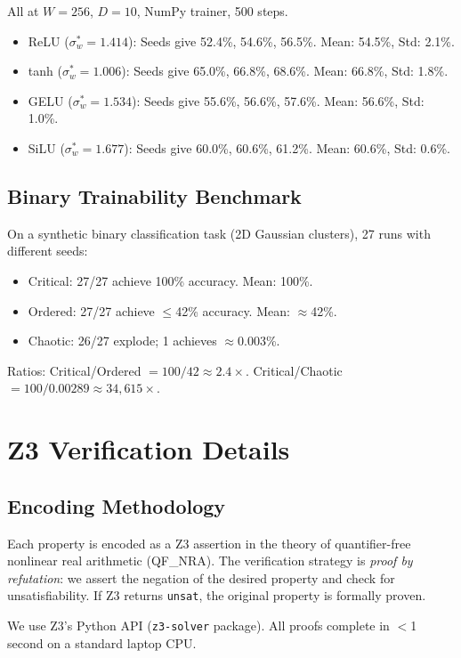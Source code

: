 \documentclass[10pt]{article}
\begin{document}
All at $W=256$, $D=10$, NumPy trainer, 500 steps.
\begin{itemize}[nosep]
    \item ReLU ($\sigma_w^* = 1.414$): Seeds give 52.4\%, 54.6\%, 56.5\%.  Mean: 54.5\%, Std: 2.1\%.
    \item tanh ($\sigma_w^* = 1.006$): Seeds give 65.0\%, 66.8\%, 68.6\%.  Mean: 66.8\%, Std: 1.8\%.
    \item GELU ($\sigma_w^* = 1.534$): Seeds give 55.6\%, 56.6\%, 57.6\%.  Mean: 56.6\%, Std: 1.0\%.
    \item SiLU ($\sigma_w^* = 1.677$): Seeds give 60.0\%, 60.6\%, 61.2\%.  Mean: 60.6\%, Std: 0.6\%.
\end{itemize}

\subsection{Binary Trainability Benchmark}

On a synthetic binary classification task (2D Gaussian clusters), 27 runs with different seeds:
\begin{itemize}[nosep]
    \item Critical: 27/27 achieve 100\% accuracy.  Mean: 100\%.
    \item Ordered: 27/27 achieve $\leq$42\% accuracy.  Mean: $\approx$42\%.
    \item Chaotic: 26/27 explode; 1 achieves $\approx$0.003\%.
\end{itemize}
Ratios: Critical/Ordered $= 100/42 \approx 2.4\times$.  Critical/Chaotic $= 100/0.00289 \approx 34{,}615\times$.


\section{Z3 Verification Details}
\label{app:z3}

\subsection{Encoding Methodology}

Each property is encoded as a Z3 assertion in the theory of quantifier-free nonlinear real arithmetic (QF\_NRA).
The verification strategy is \emph{proof by refutation}: we assert the negation of the desired property and check for unsatisfiability.
If Z3 returns \texttt{unsat}, the original property is formally proven.

We use Z3's Python API (\texttt{z3-solver} package).
All proofs complete in $<$1 second on a standard laptop CPU.
\end{document}
